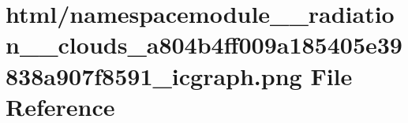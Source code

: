 \hypertarget{namespacemodule____radiation____clouds__a804b4ff009a185405e39838a907f8591__icgraph_8png}{}\section{html/namespacemodule\+\_\+\+\_\+radiation\+\_\+\+\_\+clouds\+\_\+a804b4ff009a185405e39838a907f8591\+\_\+icgraph.png File Reference}
\label{namespacemodule____radiation____clouds__a804b4ff009a185405e39838a907f8591__icgraph_8png}
